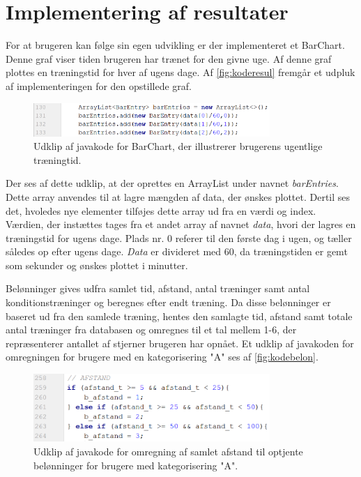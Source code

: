 \section{Implementering af resultater}
For at brugeren kan følge sin egen udvikling er der implementeret et BarChart. Denne graf viser tiden brugeren har trænet for den givne uge. Af denne graf plottes en træningstid for hver af ugens dage. Af \autoref{fig:koderesul} fremgår et udpluk af implementeringen for den opstillede graf.

\begin{figure} [H]
\centering
\includegraphics[width=0.8\textwidth]{figures/imple/koderesul}
\caption{Udklip af javakode for BarChart, der illustrerer brugerens ugentlige træningtid.}
\label{fig:koderesul}
\end{figure} 

Der ses af dette udklip, at der oprettes en ArrayList under navnet \textit{barEntries}. Dette array anvendes til at lagre mængden af data, der ønskes plottet. Dertil ses det, hvoledes nye elementer tilføjes dette array ud fra en værdi og index. Værdien, der instættes tages fra et andet array af navnet \textit{data}, hvori der lagres en træningstid for ugens dage. Plads nr. 0 referer til den første dag i ugen, og tæller således op efter ugens dage. \textit{Data} er divideret med 60, da træningstiden er gemt som sekunder og ønskes plottet i minutter. 

Belønninger gives udfra samlet tid, afstand, antal træninger samt antal konditionstræninger og beregnes efter endt træning. Da disse belønninger er baseret ud fra den samlede træning, hentes den samlagte tid, afstand samt totale antal træninger fra databasen og omregnes til et tal mellem 1-6, der repræsenterer antallet af stjerner brugeren har opnået. Et udklip af javakoden for omregningen for brugere med en kategorisering "A" ses af \autoref{fig:kodebelon}.

\begin{figure} [H]
\centering
\includegraphics[width=0.8\textwidth]{figures/imple/kodebelon}
\caption{Udklip af javakode for omregning af samlet afstand til optjente belønninger for brugere med kategorisering "A".}
\label{fig:kodebelon}
\end{figure} 

